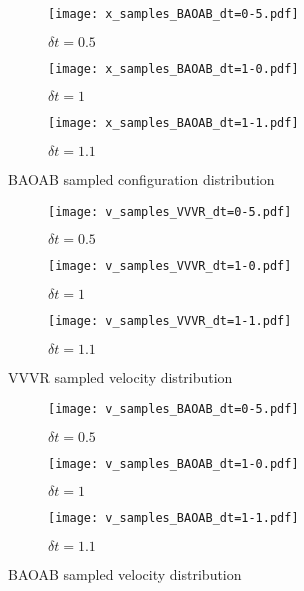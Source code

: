 \documentclass[11pt]{article}
\begin{document}
\begin{figure}[H] %
    \centering
    \begin{subfigure}[b]{0.3\textwidth}
        \texttt{[image: x\_samples\_BAOAB\_dt=0-5.pdf]}
        \caption{$\delta t = 0.5$}
    \end{subfigure}
    \begin{subfigure}[b]{0.3\textwidth}
        \texttt{[image: x\_samples\_BAOAB\_dt=1-0.pdf]}
        \caption{$\delta t = 1$}
    \end{subfigure}
    \begin{subfigure}[b]{0.3\textwidth}
        \texttt{[image: x\_samples\_BAOAB\_dt=1-1.pdf]}
        \caption{$\delta t = 1.1$}
    \end{subfigure}
    \caption{BAOAB sampled configuration distribution}
\end{figure}

\begin{figure}[H] %
    \centering
    \begin{subfigure}[b]{0.3\textwidth}
        \texttt{[image: v\_samples\_VVVR\_dt=0-5.pdf]}
        \caption{$\delta t = 0.5$}
    \end{subfigure}
    \begin{subfigure}[b]{0.3\textwidth}
        \texttt{[image: v\_samples\_VVVR\_dt=1-0.pdf]}
        \caption{$\delta t = 1$}
    \end{subfigure}
    \begin{subfigure}[b]{0.3\textwidth}
        \texttt{[image: v\_samples\_VVVR\_dt=1-1.pdf]}
        \caption{$\delta t = 1.1$}
    \end{subfigure}
    \caption{VVVR sampled velocity distribution}
\end{figure}
\begin{figure}[H] %
    \centering
    \begin{subfigure}[b]{0.3\textwidth}
        \texttt{[image: v\_samples\_BAOAB\_dt=0-5.pdf]}
        \caption{$\delta t = 0.5$}
    \end{subfigure}
    \begin{subfigure}[b]{0.3\textwidth}
        \texttt{[image: v\_samples\_BAOAB\_dt=1-0.pdf]}
        \caption{$\delta t = 1$}
    \end{subfigure}
    \begin{subfigure}[b]{0.3\textwidth}
        \texttt{[image: v\_samples\_BAOAB\_dt=1-1.pdf]}
        \caption{$\delta t = 1.1$}
    \end{subfigure}
    \caption{BAOAB sampled velocity distribution}
\end{figure}
\end{document}
